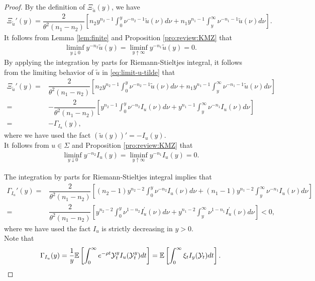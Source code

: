 \documentclass[a4paper,report, 11pt]{article}
\def\t{\theta}
\begin{document}
\begin{proof}
	 By the definition of $\Xi_{\tilde{u}}(y)$, we have 
	\begin{align*}
	\Xi_{\tilde{u}}'(y)=\dfrac{2}{\t^2(n_1-n_2)}\left[n_2 y^{n_2-1}\int_0^y \nu^{-n_2-1}\tilde{u}(\nu)d\nu +n_1y^{n_1-1}\int_y^\infty \nu^{-n_1-1}\tilde{u}(\nu)d\nu\right]. 
	\end{align*}
	It follows from Lemma \ref{lem:finite} and Proposition \ref{pro:review:KMZ} that 
	\begin{align}\label{eq:limit-u-tilde}
	\liminf_{y\downarrow 0}y^{-n_2}\tilde{u}(y) = \liminf_{y\uparrow \infty} y^{-n_1}\tilde{u}(y)=0. 
	\end{align}
	By applying the integration by parts for Riemann-Stieltjes integral, it follows from the limiting behavior of $\tilde{u}$ in \eqref{eq:limit-u-tilde} that 
	\begin{align*}
	\Xi_{\tilde{u}}'(y)=&\dfrac{2}{\t^2(n_1-n_2)}\left[n_2 y^{n_2-1}\int_0^y \nu^{-n_2-1}\tilde{u}(\nu)d\nu +n_1y^{n_1-1}\int_y^\infty \nu^{-n_1-1}\tilde{u}(\nu)d\nu\right]\\
	=&-\dfrac{2}{\t^2(n_1-n_2)}\left[y^{n_2-1}\int_0^y \nu^{-n_2}I_u(\nu)d\nu +y^{n_1-1}\int_y^\infty \nu^{-n_1}I_u(\nu)d\nu\right]\\
	=&-\Gamma_{I_u}(y),
	\end{align*}
	where we have used the fact $(\tilde{u}(y))'=-I_u(y)$.\\
	
	 It follows from $u\in \Sigma$ and Proposition \ref{pro:review:KMZ} that 
	\begin{align}\label{eq:limit-I-u}
	\liminf_{y\downarrow 0}y^{-n_2}I_u(y) = \liminf_{y\uparrow \infty} y^{-n_1}I_u(y)=0. 
	\end{align}
	
	The integration by parts for Riemann-Stieltjes integral implies that 
	\begin{align*}
	\Gamma_{I_u}'(y)=&\dfrac{2}{\t^2(n_1-n_2)}\left[(n_2-1)y^{n_2-2}\int_0^y \nu^{-n_2}I_u(\nu)d\nu +(n_1-1)y^{n_1-2}\int_y^\infty \nu^{-n_1}I_u(\nu)d\nu\right]\\
	=&\dfrac{2}{\t^2(n_1-n_2)}\left[y^{n_2-2}\int_0^y \nu^{1-n_2}I^{\prime}_u(\nu)d\nu +y^{n_1-2}\int_y^\infty \nu^{1-n_1}I^{\prime}_u(\nu)d\nu\right]<0,
	\end{align*}
	where we have used the fact $I_u$ is strictly decreasing in $y>0$.\\
	
	 Note that 
	\begin{equation*}
	\Gamma_{I_u}(y)=\dfrac{1}{y}\mathbb{E}\left[\int_0^\infty e^{-\rho t}{\cal Y}_t^y I_u({\cal Y}_t^y)dt\right]=\mathbb{E}\left[\int_0^\infty \xi_t I_y({\cal Y}_t)dt\right]. 
	\end{equation*}
	

\end{proof}
\end{document}
